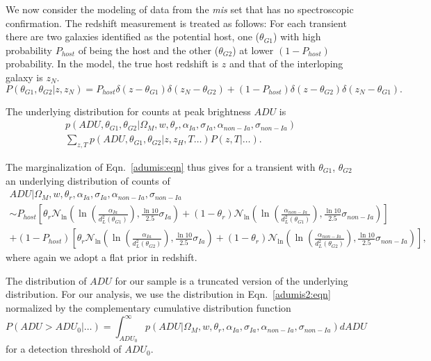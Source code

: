 \documentclass[preprint]{aastex}
\begin{document}
We now consider the modeling of data from the  {\it mis}
set that has no spectroscopic confirmation.
The redshift measurement is treated as follows:
For each transient there are two galaxies identified as
the potential host, one ($\theta_{G1}$) with high probability $P_{host}$
of being the host and the other
($\theta_{G2}$) at lower $(1-P_{host})$ probability.
In the model, the
true host redshift is $z$ and that of the interloping galaxy is $z_N$.
\begin{equation}
P(\theta_{G1},\theta_{G2}|z, z_N) =
	P_{host}\delta(z-\theta_{G1})\delta(z_N-\theta_{G2}) +
	(1-P_{host}) \delta(z-\theta_{G2})\delta(z_N-\theta_{G1}).
\end{equation}

The underlying distribution for counts at peak brightness $\mathit{ADU}$
is
\begin{multline}
p(\mathit{ADU}, \theta_{G1}, \theta_{G2} | \Omega_M, w, \theta_r, \alpha_{Ia},\sigma_{Ia}, \alpha_{\mathit{non-Ia}},\sigma_{\mathit{non-Ia}}) \\
 \sum_{z, T}  p(\mathit{ADU, \theta_{G1}, \theta_{G2}}| z , z_H, T \ldots)P(z, T|\ldots).
\label{adumis:eqn}
\end{multline}

The marginalization of Eqn.~\ref{adumis:eqn} thus gives for a transient with $\theta_{G1}$,
$\theta_{G2}$ an underlying distribution of counts of
 \begin{multline}
\mathit{ADU}| \Omega_M, w, \theta_r, \alpha_{Ia},\sigma_{Ia}, \alpha_{\mathit{non-Ia}},\sigma_{\mathit{non-Ia}} \\
 \sim  P_{host} \left[\theta_r \mathcal{N}_{\ln}\left(\ln{\left(\frac{\alpha_{Ia}}{d_L^2(\theta_{G1})}\right)}, \frac{\ln{10}}{2.5}\sigma_{Ia}\right)
+\left(1-\theta_r\right)
\mathcal{N}_{\ln}\left(\ln{\left(\frac{\alpha_{\mathit{non-Ia}}}{d_L^2(\theta_{G1})}\right)}, \frac{\ln{10}}{2.5}\sigma_{\mathit{non-Ia}}\right) \right] \\
 + (1-P_{host})\left[ \theta_r \mathcal{N}_{\ln}\left(\ln{\left(\frac{\alpha_{Ia}}{d_L^2(\theta_{G2})}\right)}, \frac{\ln{10}}{2.5}\sigma_{Ia}\right) 
 + \left(1-\theta_r\right)
\mathcal{N}_{\ln}\left(\ln{\left(\frac{\alpha_{\mathit{non-Ia}}}{d_L^2(\theta_{G2})}\right)}, \frac{\ln{10}}{2.5}\sigma_{\mathit{non-Ia}}\right) \right],
\label{adumis2:eqn}
\end{multline}
where again we adopt a flat prior in redshift.

The distribution of $\mathit{ADU}$ for our sample is a truncated version of the
underlying distribution.  
For our analysis, we use the distribution in  Eqn.~\ref{adumis2:eqn} normalized by
the complementary cumulative distribution function
\begin{equation}
P(\mathit{ADU}>\mathit{ADU}_0|\ldots) = \int_{\mathit{ADU}_0}^{\infty} p(\mathit{ADU}|\Omega_M, w, \theta_r, \alpha_{Ia},\sigma_{Ia}, \alpha_{\mathit{non-Ia}},\sigma_{\mathit{non-Ia}})d\mathit{ADU}
\end{equation}
for a detection threshold of $\mathit{ADU}_0$.
\end{document}
